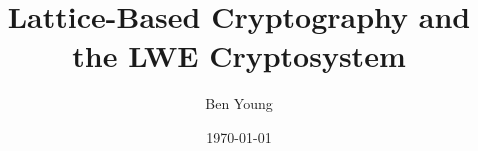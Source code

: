 \documentclass[10pt,letterpaper]{article}
\author{Ben Young}
\title{Lattice-Based Cryptography and the LWE Cryptosystem}
\date{\today}
\begin{document}
    \maketitle
    \tableofcontents

    \pagebreak
    
    \pagebreak
    
    \pagebreak
    
    \pagebreak
    
    \pagebreak
    
\end{document}
